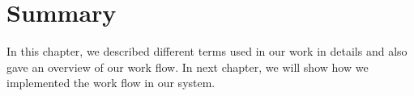 \section{Summary}
\label{sec:Summary}
In this chapter, we described different terms used in our work in details and also gave an overview of our work flow.
In next chapter, we will show how we implemented the work flow in our system.


